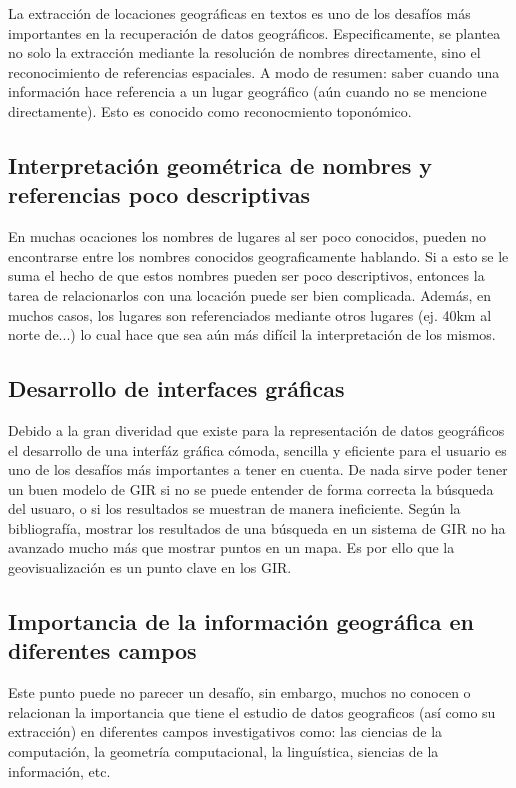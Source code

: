 La extracción de locaciones geográficas en textos es uno de los desafíos más
importantes en la recuperación de datos geográficos. Especificamente, se plantea
no solo la extracción mediante la resolución de nombres directamente, sino
el reconocimiento de referencias espaciales. A modo de resumen: saber cuando una
información hace referencia a un lugar geográfico (aún cuando no se mencione
directamente). Esto es conocido como reconocmiento toponómico.

\subsection{Interpretación geométrica de nombres y referencias poco
descriptivas}\label{sec:geom}

En muchas ocaciones los nombres de lugares al ser poco conocidos, pueden no
encontrarse entre los nombres conocidos geograficamente hablando. Si a esto
se le suma el hecho de que estos nombres pueden ser poco descriptivos, entonces
la tarea de relacionarlos con una locación puede ser bien complicada. Además,
en muchos casos, los lugares son referenciados mediante otros lugares (ej. 
40km al norte de...) lo cual hace que sea aún más difícil la interpretación de
los mismos.

\subsection{Desarrollo de interfaces gráficas}\label{sec:gui}

Debido a la gran diveridad que existe para la representación de datos
geográficos el desarrollo de una interfáz gráfica cómoda, sencilla y eficiente
para el usuario es uno de los desafíos más importantes a tener en cuenta. De
nada sirve poder tener un buen modelo de GIR si no se puede entender de forma
correcta la búsqueda del usuaro, o si los resultados se muestran de manera
ineficiente. Según la bibliografía, mostrar los resultados de una búsqueda en
un sistema de GIR no ha avanzado mucho más que mostrar puntos en un mapa. Es
por ello que la geovisualización es un punto clave en los GIR.


\subsection{Importancia de la información geográfica en diferentes
campos}\label{sec:import}

Este punto puede no parecer un desafío, sin embargo, muchos no conocen o relacionan
la importancia que tiene el estudio de datos geograficos (así como su extracción)
en diferentes campos investigativos como: las ciencias de la computación, la 
geometría computacional, la linguística, siencias de la información, etc.

